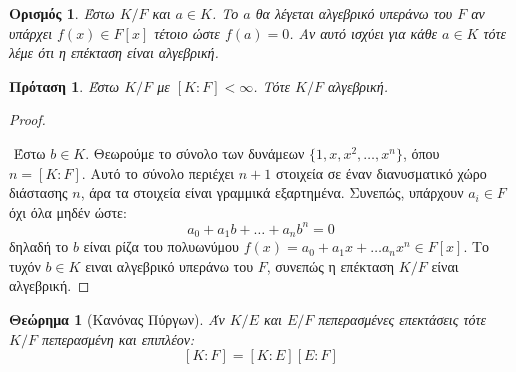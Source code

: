 \documentclass[oneside,a4paper]{article}
\newtheorem{theorem}{Θεώρημα}
\newtheorem*{defn}{Ορισμός}
\newtheorem{prop}{Πρόταση}
\begin{document}
\begin{defn}
	Έστω $K/F$ και $a \in K$. Το $a$ θα λέγεται αλγεβρικό υπεράνω του $F$ αν υπάρχει $f(x) \in F[x]$ τέτοιο ώστε $f(a)=0$. Αν αυτό ισχύει για κάθε $a \in K$ τότε λέμε ότι η επέκταση είναι αλγεβρική.
\end{defn}
\vspace{0.1cm}
\begin{prop}
	Έστω $K/F$ με $[K:F]<\infty$. Τότε $K/F$ αλγεβρική.
\end{prop}

\begin{proof} $ $

	$ $\newline
	Έστω $b \in K$. Θεωρούμε το σύνολο των δυνάμεων $\{1,x,x^2,\ldots,x^n\}$, όπου $n = [K:F]$. Αυτό το σύνολο περιέχει $n+1$ στοιχεία σε έναν διανυσματικό χώρο διάστασης $n$, άρα τα στοιχεία είναι γραμμικά εξαρτημένα. Συνεπώς, υπάρχουν $a_i \in F$ όχι όλα μηδέν ώστε:
	$$a_0 + a_1 b + \ldots + a_n b^n = 0$$
	δηλαδή το $b$ είναι ρίζα του πολυωνύμου $f(x) = a_0 + a_1 x + \ldots a_n x^n \in F[x]$. Το τυχόν $b \in K$ ειναι αλγεβρικό υπεράνω του $F$, συνεπώς η επέκταση $K/F$ είναι αλγεβρική.
\end{proof}
\vspace{0.1cm}
\begin{theorem}[Κανόνας Πύργων]
	Άν $K/E$ και $E/F$ πεπερασμένες επεκτάσεις τότε $K/F$ πεπερασμένη και επιπλέον:
	$$[K:F]=[K:E][E:F]$$
\end{theorem}
\end{document}
